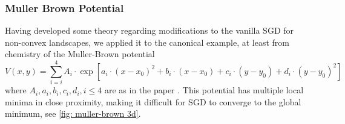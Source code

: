 \documentclass{article}
\begin{document}
\subsubsection{Muller Brown Potential}

Having developed some theory regarding modifications to the vanilla SGD for non-convex landscapes, we applied it to the canonical example, at least from chemistry \cite{muller1979location} of the Muller-Brown potential 
\begin{equation}
	V(x,y) = \displaystyle\sum^{4}_{i=i}A_{i}\cdot \exp[a_{i}\cdot(x-x_{0})^{2}+b_{i}\cdot(x-x_{0})+c_{i}\cdot(y-y_{0})+d_{i}\cdot (y-y_{0})^{2}] 
\end{equation}
where $A_{i}, a_{i}, b_{i}, c_{i}, d_{i}, i\leq 4$ are as in the paper \cite{muller1979location}. This potential has multiple local minima in close proximity, making it difficult for SGD to converge to the global minimum, see \ref{fig: muller-brown 3d}.
\end{document}
